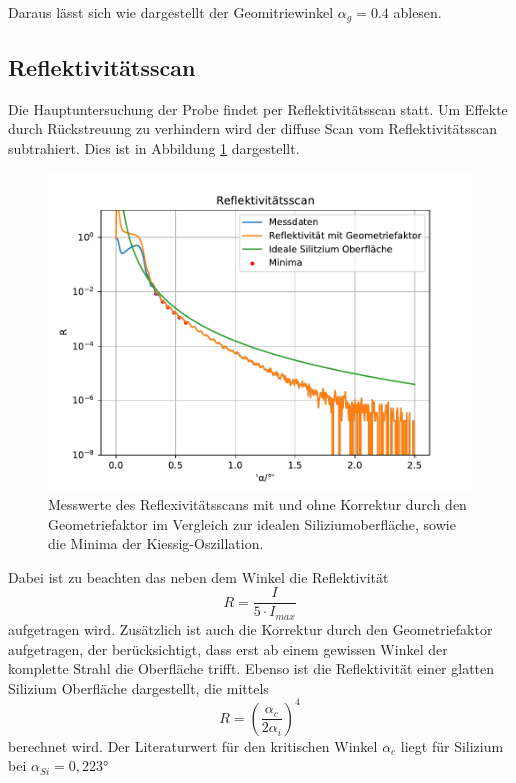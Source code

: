 Daraus lässt sich wie dargestellt der Geomitriewinkel $\alpha_g = 0.4$ ablesen.



\subsection{Reflektivitätsscan}
Die Hauptuntersuchung der Probe findet per Reflektivitätsscan statt.
Um Effekte durch Rückstreuung zu verhindern wird der diffuse Scan vom Reflektivitätsscan subtrahiert.
Dies ist in Abbildung \ref{fig:ref} dargestellt.
\begin{figure}[h]
    \centering
    \includegraphics[width = 1\textwidth]{Auswertung/Graphen/Reflektivitaetsscan.pdf}
    \caption{Messwerte des Reflexivitätsscans mit und ohne Korrektur durch den Geometriefaktor im Vergleich zur idealen Siliziumoberfläche, sowie die Minima der Kiessig-Oszillation.}
    \label{fig:ref}
\end{figure}
Dabei ist zu beachten das neben dem Winkel die Reflektivität
\begin{equation*}
    R = \frac{I}{5\cdot I_{max}} 
\end{equation*}
aufgetragen wird.
Zusätzlich ist auch die Korrektur durch den Geometriefaktor aufgetragen,
der berücksichtigt,
dass erst ab einem gewissen Winkel der komplette Strahl die Oberfläche trifft.
Ebenso ist die Reflektivität einer glatten Silizium Oberfläche dargestellt,
die mittels
\begin{equation}
    R = \left(\frac{\alpha_c}{2\alpha_i}\right)^4
\end{equation}
berechnet wird. 
Der Literaturwert für den kritischen Winkel $\alpha_c$ liegt für Silizium bei $\alpha_{Si} = 0,223°$ \cite{wert}

